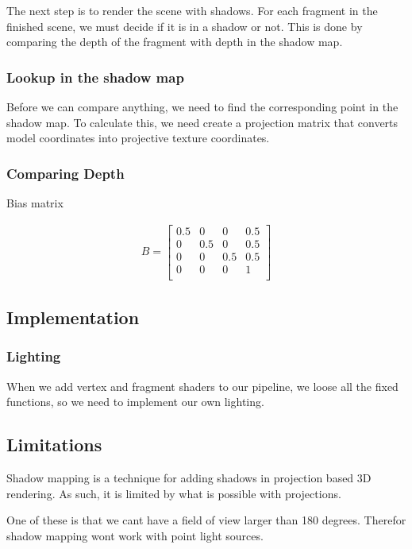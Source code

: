 The next step is to render the scene with shadows. For each fragment
in the finished scene, we must decide if it is in a shadow or
not. This is done by comparing the depth of the fragment with depth in
the shadow map.

\subsubsection{Lookup in the shadow map}

Before we can compare anything, we need to find the corresponding
point in the shadow map. To calculate this, we need create a
projection matrix that converts model coordinates into projective
texture coordinates.

\subsubsection{Comparing Depth}

Bias matrix

\begin{align*}
  B = \begin{bmatrix}
    0.5 & 0   & 0   & 0.5 \\
    0   & 0.5 & 0   & 0.5 \\
    0   & 0   & 0.5 & 0.5 \\
    0   & 0   & 0   & 1   \\
  \end{bmatrix}
\end{align*}


\subsection{Implementation}

\subsubsection{Lighting}

When we add vertex and fragment shaders to our pipeline, we loose all
the fixed functions, so we need to implement our own lighting.

\subsection{Limitations}



Shadow mapping is a technique for adding shadows in projection based 
3D rendering. As such, it is limited by what is possible with projections.

One of these is that we cant have a field of view larger than 180
degrees. Therefor shadow mapping wont work with point
light sources.

